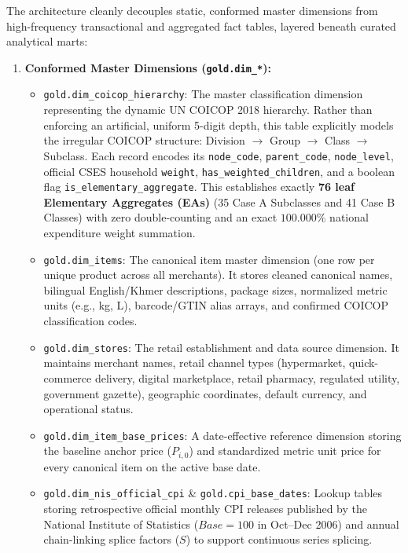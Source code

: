 \hs The architecture cleanly decouples static, conformed master dimensions from high-frequency transactional and aggregated fact tables, layered beneath curated analytical marts:
\begin{enumerate}
    \item \textbf{Conformed Master Dimensions (\texttt{gold.dim\_*}):}
    \begin{itemize}
        \item \texttt{gold.dim\_coicop\_hierarchy}: The master classification dimension representing the dynamic UN COICOP 2018 hierarchy. Rather than enforcing an artificial, uniform 5-digit depth, this table explicitly models the irregular COICOP structure: Division $\to$ Group $\to$ Class $\to$ Subclass. Each record encodes its \texttt{node\_code}, \texttt{parent\_code}, \texttt{node\_level}, official CSES household \texttt{weight}, \texttt{has\_weighted\_children}, and a boolean flag \texttt{is\_elementary\_aggregate}. This establishes exactly \textbf{76 leaf Elementary Aggregates (EAs)} (35 Case A Subclasses and 41 Case B Classes) with zero double-counting and an exact $100.000\%$ national expenditure weight summation.
        \item \texttt{gold.dim\_items}: The canonical item master dimension (one row per unique product across all merchants). It stores cleaned canonical names, bilingual English/Khmer descriptions, package sizes, normalized metric units (e.g., kg, L), barcode/GTIN alias arrays, and confirmed COICOP classification codes.
        \item \texttt{gold.dim\_stores}: The retail establishment and data source dimension. It maintains merchant names, retail channel types (hypermarket, quick-commerce delivery, digital marketplace, retail pharmacy, regulated utility, government gazette), geographic coordinates, default currency, and operational status.
        \item \texttt{gold.dim\_item\_base\_prices}: A date-effective reference dimension storing the baseline anchor price ($P_{i,0}$) and standardized metric unit price for every canonical item on the active base date.
        \item \texttt{gold.dim\_nis\_official\_cpi} \& \texttt{gold.cpi\_base\_dates}: Lookup tables storing retrospective official monthly CPI releases published by the National Institute of Statistics ($Base = 100$ in Oct--Dec 2006) and annual chain-linking splice factors ($S$) to support continuous series splicing.
    \end{itemize}


\end{enumerate}
